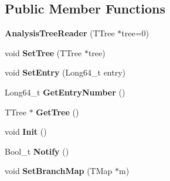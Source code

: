 \subsection*{Public Member Functions}
\begin{DoxyCompactItemize}
\item 
\hypertarget{class_h_a_l_1_1_analysis_tree_reader_ac00ba35d0b860566482e32c1dfd04827}{{\bfseries Analysis\+Tree\+Reader} (T\+Tree $\ast$tree=0)}\label{class_h_a_l_1_1_analysis_tree_reader_ac00ba35d0b860566482e32c1dfd04827}

\item 
\hypertarget{class_h_a_l_1_1_analysis_tree_reader_a031181c782d3620d271a92cef995d998}{void {\bfseries Set\+Tree} (T\+Tree $\ast$tree)}\label{class_h_a_l_1_1_analysis_tree_reader_a031181c782d3620d271a92cef995d998}

\item 
\hypertarget{class_h_a_l_1_1_analysis_tree_reader_a1a9c8bc30141df5fab1163f006fb08e3}{void {\bfseries Set\+Entry} (Long64\+\_\+t entry)}\label{class_h_a_l_1_1_analysis_tree_reader_a1a9c8bc30141df5fab1163f006fb08e3}

\item 
\hypertarget{class_h_a_l_1_1_analysis_tree_reader_a6fcf94a452ec53b66d9e0e49062d4e44}{Long64\+\_\+t {\bfseries Get\+Entry\+Number} ()}\label{class_h_a_l_1_1_analysis_tree_reader_a6fcf94a452ec53b66d9e0e49062d4e44}

\item 
\hypertarget{class_h_a_l_1_1_analysis_tree_reader_a6ad8933bd6c8cc2b17179c96fd3bfcb1}{T\+Tree $\ast$ {\bfseries Get\+Tree} ()}\label{class_h_a_l_1_1_analysis_tree_reader_a6ad8933bd6c8cc2b17179c96fd3bfcb1}

\item 
\hypertarget{class_h_a_l_1_1_analysis_tree_reader_ab17ea6c10da56d9282d60d9507e01ef9}{void {\bfseries Init} ()}\label{class_h_a_l_1_1_analysis_tree_reader_ab17ea6c10da56d9282d60d9507e01ef9}

\item 
\hypertarget{class_h_a_l_1_1_analysis_tree_reader_adfe7aa4110b150fb1c7e80580a775a82}{Bool\+\_\+t {\bfseries Notify} ()}\label{class_h_a_l_1_1_analysis_tree_reader_adfe7aa4110b150fb1c7e80580a775a82}

\item 
\hypertarget{class_h_a_l_1_1_analysis_tree_reader_ae3dcc57b2cc27431e89edd341b300eb6}{void {\bfseries Set\+Branch\+Map} (T\+Map $\ast$m)}\label{class_h_a_l_1_1_analysis_tree_reader_ae3dcc57b2cc27431e89edd341b300eb6}


\end{DoxyCompactItemize}
